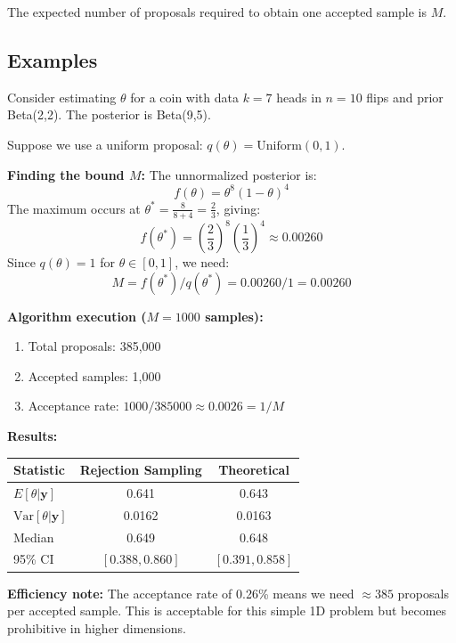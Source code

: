 \begin{corollary}
The expected number of proposals required to obtain one accepted sample is $M$.
\end{corollary}

\subsection{Examples}
\begin{examplebox}
\begin{example}
Consider estimating $\theta$ for a coin with data $k=7$ heads in $n=10$ flips and prior Beta(2,2). The posterior is Beta(9,5).

Suppose we use a uniform proposal: $q(\theta) = \text{Uniform}(0,1)$.

\textbf{Finding the bound $M$:}
The unnormalized posterior is:
$$f(\theta) = \theta^8(1-\theta)^4$$
The maximum occurs at $\theta^* = \frac{8}{8+4} = \frac{2}{3}$, giving:
$$f(\theta^*) = \left(\frac{2}{3}\right)^8 \left(\frac{1}{3}\right)^4 \approx 0.00260$$
Since $q(\theta) = 1$ for $\theta \in [0,1]$, we need:
$$M = f(\theta^*) / q(\theta^*) = 0.00260 / 1 = 0.00260$$

\textbf{Algorithm execution ($M=1000$ samples):}
\begin{enumerate}
\item Total proposals: 385,000
\item Accepted samples: 1,000
\item Acceptance rate: $1000/385000 \approx 0.0026 = 1/M$
\end{enumerate}

\textbf{Results:}
\begin{center}
\begin{tabular}{lcc}
\toprule
Statistic & Rejection Sampling & Theoretical \\
\midrule
$E[\theta|\mathbf{y}]$ & 0.641 & 0.643 \\
$\text{Var}[\theta|\mathbf{y}]$ & 0.0162 & 0.0163 \\
Median & 0.649 & 0.648 \\
95\% CI & $[0.388, 0.860]$ & $[0.391, 0.858]$ \\
\bottomrule
\end{tabular}
\end{center}
\textbf{Efficiency note:} The acceptance rate of 0.26\% means we need $\approx 385$ proposals per accepted sample. This is acceptable for this simple 1D problem but becomes prohibitive in higher dimensions.
\end{example}
\end{examplebox}

